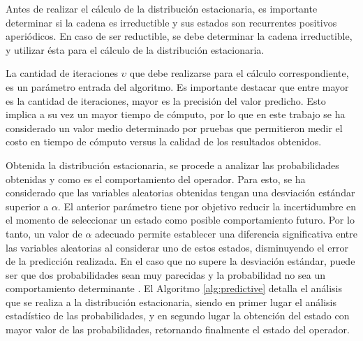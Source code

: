 
\normalsize{Antes de realizar el c\'alculo de la distribuci\'on estacionaria, es importante determinar si la cadena es irreductible y sus estados son recurrentes positivos aperi\'odicos. En caso de ser reductible, se debe determinar la cadena irreductible, y utilizar \'esta para el c\'alculo de la distribuci\'on estacionaria.}

La cantidad de iteraciones $\upsilon$ que debe realizarse para el c\'alculo correspondiente, es un par\'ametro entrada del algoritmo. Es importante destacar que entre mayor es la cantidad de iteraciones, mayor es la precisi\'on del valor predicho. Esto implica a su vez un mayor tiempo de c\'omputo, por lo que en este trabajo se ha considerado un valor medio determinado por pruebas que permitieron medir el costo en tiempo de c\'omputo versus la calidad de los resultados obtenidos.



Obtenida la distribuci\'on estacionaria, se procede a analizar las probabilidades obtenidas y como es el comportamiento del operador. Para esto, se ha considerado que las variables aleatorias obtenidas tengan una desviaci\'on est\'andar superior a $\alpha$. El anterior par\'ametro tiene por objetivo reducir la incertidumbre en el momento de seleccionar un estado como posible comportamiento futuro. \normalsize{Por lo tanto, un valor de $\alpha$ adecuado permite establecer una diferencia significativa entre las variables aleatorias al considerar uno de estos estados, disminuyendo el error de la predicci\'on realizada.} En el caso que no supere la desviaci\'on est\'andar, puede ser que dos probabilidades sean muy parecidas y la probabilidad no sea un comportamiento determinante \citep{soong2004fundamentals}. El Algoritmo \ref{alg:predictive} detalla el an\'alisis que se realiza a la distribuci\'on estacionaria, siendo en primer lugar el an\'alisis estad\'istico de las probabilidades, y en segundo lugar la obtenci\'on del estado con mayor valor de las probabilidades, retornando finalmente el estado del operador.

